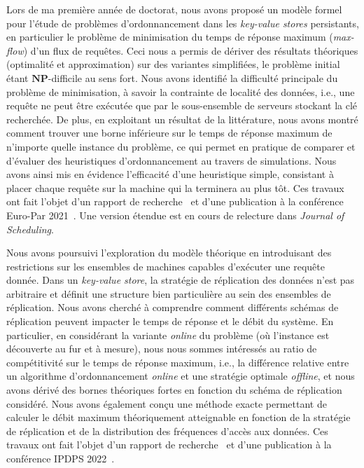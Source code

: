 \documentclass[12pt]{article}
\begin{document}
Lors de ma première année de doctorat, nous avons proposé un modèle formel pour l'étude de problèmes
d'ordonnancement dans les \emph{key-value stores} persistants, en particulier le problème de
minimisation du temps de réponse maximum (\emph{max-flow}) d'un flux de requêtes.  
Ceci nous a permis de dériver des résultats théoriques (optimalité et approximation) sur des
variantes simplifiées, le problème initial étant \(\mathbf{NP}\)-difficile au sens fort.  
Nous avons identifié la difficulté principale du problème de minimisation, à savoir la contrainte de
localité des données, i.e., une requête ne peut être exécutée que par le sous-ensemble de serveurs
stockant la clé recherchée.  
De plus, en exploitant un résultat de la littérature, nous avons montré comment trouver une borne
inférieure sur le temps de réponse maximum de n'importe quelle instance du problème, ce qui permet
en pratique de comparer et d'évaluer des heuristiques d'ordonnancement au travers de simulations.  
Nous avons ainsi mis en évidence l'efficacité d'une heuristique simple, consistant à placer chaque
requête sur la machine qui la terminera au plus tôt.  
Ces travaux ont fait l'objet d'un rapport de recherche~\cite{benmokhtar2021-rr} et d'une publication
à la conférence Euro-Par 2021~\cite{benmokhtar2021}.  
Une version étendue est en cours de relecture dans \emph{Journal of Scheduling}.

Nous avons poursuivi l'exploration du modèle théorique en introduisant des restrictions sur les
ensembles de machines capables d'exécuter une requête donnée.  
Dans un \emph{key-value store}, la stratégie de réplication des données n'est pas arbitraire et
définit une structure bien particulière au sein des ensembles de réplication.  
Nous avons cherché à comprendre comment différents schémas de réplication peuvent impacter le temps
de réponse et le débit du système.  
En particulier, en considérant la variante \emph{online} du problème (où l'instance est découverte
au fur et à mesure), nous nous sommes intéressés au ratio de compétitivité sur le temps de réponse
maximum, i.e., la différence relative entre un algorithme d'ordonnancement \emph{online} et une
stratégie optimale \emph{offline}, et nous avons dérivé des bornes théoriques fortes en fonction du
schéma de réplication considéré.  
Nous avons également conçu une méthode exacte permettant de calculer le débit maximum théoriquement
atteignable en fonction de la stratégie de réplication et de la distribution des fréquences d'accès
aux données.  
Ces travaux ont fait l'objet d'un rapport de recherche~\cite{canon2022-rr} et d'une publication à la
conférence IPDPS 2022~\cite{canon2022}.
\end{document}
